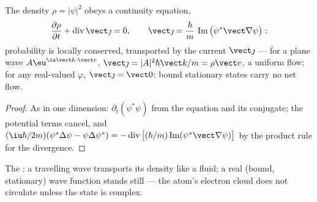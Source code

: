 \begin{proposition}\label{prop:b3:schrodinger-three-dimensions:current}
The density $\rho = |\psi|^2$ obeys a continuity equation,
\[
\frac{\partial\rho}{\partial t} + \operatorname{div}\vect\jmath = 0 ,
\qquad
\vect\jmath = \frac{\hbar}{m}\,
\operatorname{Im}\big(\psi^*\vect\nabla\psi\big) :
\]
probability is locally conserved, transported by the current
$\vect\jmath$ --- for a plane wave $A\eu^{\iu\vect k\cdot\vect r}$,
$\vect\jmath = |A|^2\hbar\vect k/m = \rho\vect v$, a uniform flow;
for any real-valued $\varphi$, $\vect\jmath = \vect 0$: bound
stationary states carry no net flow.
\end{proposition}

\begin{proof}
As in one dimension: $\partial_t(\psi^*\psi)$ from the equation and
its conjugate; the potential terms cancel, and $(\iu\hbar/2m)
(\psi^*\Delta\psi - \psi\Delta\psi^*) =
-\operatorname{div}\big[(\hbar/m)\operatorname{Im}(\psi^*\vect\nabla
\psi)\big]$ by the product rule for the divergence.
\end{proof}

\begin{omfigure}

{\small The : a travelling wave transports its
density like a fluid; a real (bound, stationary) wave function stands
still --- the atom's electron cloud does not circulate unless the
state is complex.}
\end{omfigure}

